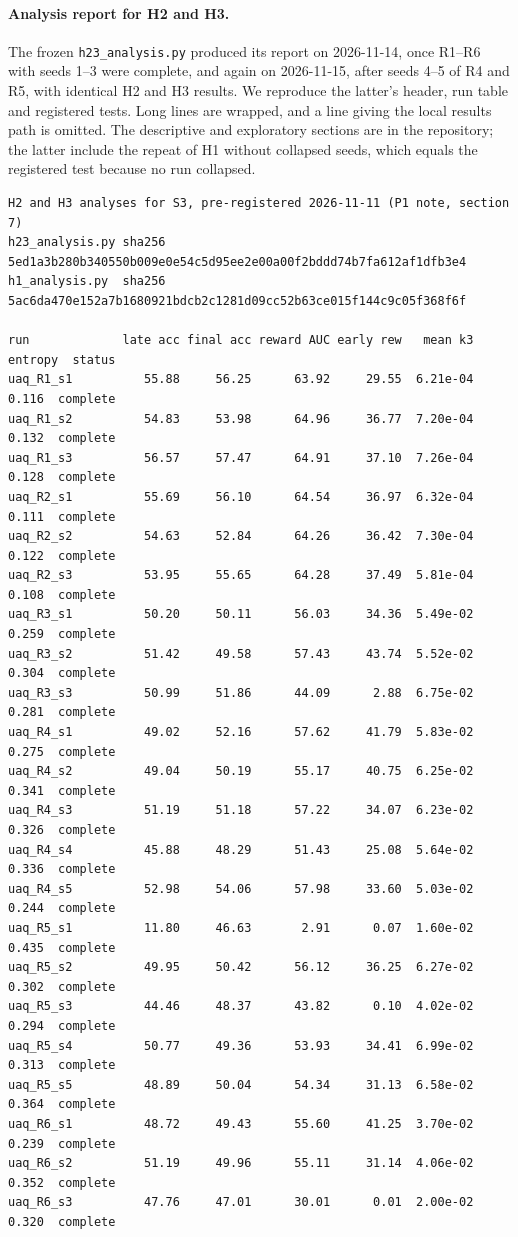 \paragraph{Analysis report for H2 and H3.} The frozen \texttt{h23\_analysis.py} produced its report on 2026-11-14, once R1--R6 with seeds 1--3 were complete, and again on 2026-11-15, after seeds 4--5 of R4 and R5, with identical H2 and H3 results. We reproduce the latter's header, run table and registered tests. Long lines are wrapped, and a line giving the local results path is omitted. The descriptive and exploratory sections are in the repository; the latter include the repeat of H1 without collapsed seeds, which equals the registered test because no run collapsed.
{\scriptsize
\begin{verbatim}
H2 and H3 analyses for S3, pre-registered 2026-11-11 (P1 note, section 7)
h23_analysis.py sha256 5ed1a3b280b340550b009e0e54c5d95ee2e00a00f2bddd74b7fa612af1dfb3e4
h1_analysis.py  sha256 5ac6da470e152a7b1680921bdcb2c1281d09cc52b63ce015f144c9c05f368f6f

run             late acc final acc reward AUC early rew   mean k3  entropy  status
uaq_R1_s1          55.88     56.25      63.92     29.55  6.21e-04    0.116  complete
uaq_R1_s2          54.83     53.98      64.96     36.77  7.20e-04    0.132  complete
uaq_R1_s3          56.57     57.47      64.91     37.10  7.26e-04    0.128  complete
uaq_R2_s1          55.69     56.10      64.54     36.97  6.32e-04    0.111  complete
uaq_R2_s2          54.63     52.84      64.26     36.42  7.30e-04    0.122  complete
uaq_R2_s3          53.95     55.65      64.28     37.49  5.81e-04    0.108  complete
uaq_R3_s1          50.20     50.11      56.03     34.36  5.49e-02    0.259  complete
uaq_R3_s2          51.42     49.58      57.43     43.74  5.52e-02    0.304  complete
uaq_R3_s3          50.99     51.86      44.09      2.88  6.75e-02    0.281  complete
uaq_R4_s1          49.02     52.16      57.62     41.79  5.83e-02    0.275  complete
uaq_R4_s2          49.04     50.19      55.17     40.75  6.25e-02    0.341  complete
uaq_R4_s3          51.19     51.18      57.22     34.07  6.23e-02    0.326  complete
uaq_R4_s4          45.88     48.29      51.43     25.08  5.64e-02    0.336  complete
uaq_R4_s5          52.98     54.06      57.98     33.60  5.03e-02    0.244  complete
uaq_R5_s1          11.80     46.63       2.91      0.07  1.60e-02    0.435  complete
uaq_R5_s2          49.95     50.42      56.12     36.25  6.27e-02    0.302  complete
uaq_R5_s3          44.46     48.37      43.82      0.10  4.02e-02    0.294  complete
uaq_R5_s4          50.77     49.36      53.93     34.41  6.99e-02    0.313  complete
uaq_R5_s5          48.89     50.04      54.34     31.13  6.58e-02    0.364  complete
uaq_R6_s1          48.72     49.43      55.60     41.25  3.70e-02    0.239  complete
uaq_R6_s2          51.19     49.96      55.11     31.14  4.06e-02    0.352  complete
uaq_R6_s3          47.76     47.01      30.01      0.01  2.00e-02    0.320  complete


\end{verbatim}}
